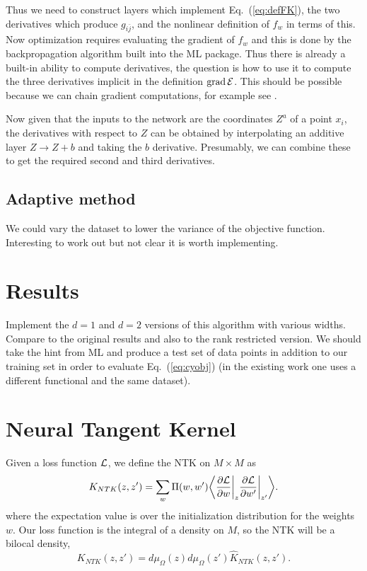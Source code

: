 \documentclass[12pt]{article}
\def\CL {{\cal L}}
\def\CE {{\cal E}}
\def\vev#1{\bigg\langle #1 \bigg\rangle}
\newcommand{\eq}[1]{Eq.~(\ref{eq:#1})}
\newcommand{\be}{\begin{equation}}
\newcommand{\ee}{\end{equation}}
\def\bj{{\bar{j}}}
\def\hK{{\hat K}}
\begin{document}
Thus we need to construct layers which implement \eq{defFK}, the two derivatives which produce $g_{i\bj}$,
and the nonlinear definition of $f_w$ in terms of this.  Now optimization requires evaluating the gradient
of $f_w$ and this is done by the backpropagation algorithm built into the ML package.  Thus there is already
a built-in ability to compute derivatives, the question is how to use it to compute the three derivatives
implicit in the definition $\mbox{grad}\, \CE$.  This should be possible because we can chain gradient
computations, for example see \cite{TFhessian}.

Now given that the inputs to the network are the coordinates $Z^a$ of a point $x_i$, the derivatives with
respect to $Z$ can be obtained by interpolating an additive layer $Z\rightarrow Z+b$ and taking the $b$
derivative.  Presumably, we can combine these to get the required second and third derivatives.


\subsection{ Adaptive method }

We could vary the dataset to lower the variance of the objective function.  Interesting to work out
but not clear it is worth implementing.

\section{ Results }

Implement the $d=1$ and $d=2$ versions of this algorithm with various widths.
Compare to the original results and also to the rank restricted version.
We should take the hint from ML and produce a test set of data points in addition to our training
set in order to evaluate \eq{cyobj} (in the existing work one uses a different functional and the same dataset).

\section{ Neural Tangent Kernel }

Given a loss function $\CL$, we define the NTK on $M\times M$ as
\be
K_{NTK}(z,z') = \sum_w \Pi(w,w') \vev{ \frac{\partial\CL}{\partial w}\bigg|_z \frac{\partial\CL}{\partial w'}\bigg|_{z'} }.
\ee
where the expectation value is over the initialization distribution for the weights $w$.
Our loss function is the integral of a density on $M$, so the NTK will be a bilocal density,
\be
K_{NTK}(z,z') = d\mu_\Omega(z) d\mu_\Omega(z') \hK_{NTK}(z,z') .
\ee
\end{document}
